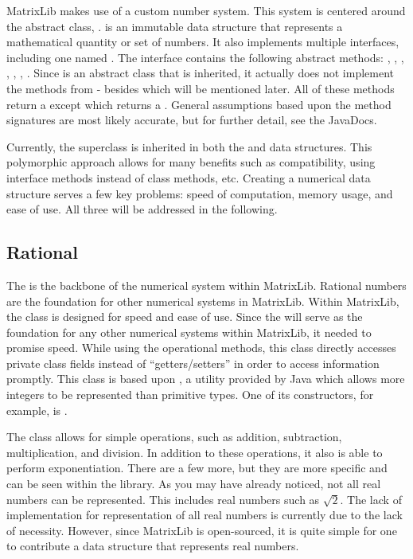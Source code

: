 MatrixLib makes use of a custom number system.
This system is centered around the abstract class, .
 is an immutable data structure that represents a mathematical quantity or set of numbers.
It also implements multiple interfaces, including one named .
The  interface contains the following abstract methods:
, , ,
, , , .
Since  is an abstract class that is inherited,
it actually does not implement the methods from  - besides  which will be mentioned later.
All of these methods return a  except  which returns a .
General assumptions based upon the method signatures are most likely accurate, but for further detail, see the JavaDocs.

Currently, the  superclass is inherited in both the  and  data structures.
This polymorphic approach allows for many benefits such as compatibility, using interface methods instead of class methods, etc.
Creating a numerical data structure serves a few key problems: speed of computation, memory usage, and ease of use.
All three will be addressed in the following.

\subsection*{Rational}
The  is the backbone of the numerical system within MatrixLib.
Rational numbers are the foundation for other numerical systems in MatrixLib.
Within MatrixLib, the  class is designed for speed and ease of use.
Since the  will serve as the foundation for any other numerical systems within MatrixLib, it needed to promise speed.
While using the operational methods, this class directly accesses private class fields instead of ``getters/setters'' in order to access information promptly.
This class is based upon , a utility provided by Java which allows more integers to be represented than primitive types.
One of its constructors, for example, is .

The  class allows for simple operations, such as addition, subtraction, multiplication, and division.
In addition to these operations, it also is able to perform exponentiation.
There are a few more, but they are more specific and can be seen within the library.
As you may have already noticed, not all real numbers can be represented.
This includes real numbers such as $\sqrt{2}$.
The lack of implementation for representation of all real numbers is currently due to the lack of necessity.
However, since MatrixLib is open-sourced, it is quite simple for one to contribute a data structure that represents real numbers.

